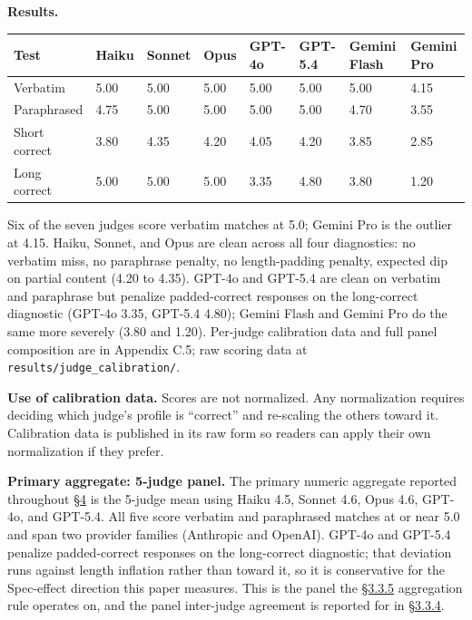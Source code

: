 \textbf{Results.}

\begin{longtable}[]{@{}llllllll@{}}
\toprule
Test & Haiku & Sonnet & Opus & GPT-4o & GPT-5.4 & Gemini Flash & Gemini
Pro \\
\midrule
\endhead
Verbatim & 5.00 & 5.00 & 5.00 & 5.00 & 5.00 & 5.00 & 4.15 \\
Paraphrased & 4.75 & 5.00 & 5.00 & 5.00 & 5.00 & 4.70 & 3.55 \\
Short correct & 3.80 & 4.35 & 4.20 & 4.05 & 4.20 & 3.85 & 2.85 \\
Long correct & 5.00 & 5.00 & 5.00 & 3.35 & 4.80 & 3.80 & 1.20 \\
\bottomrule
\end{longtable}

Six of the seven judges score verbatim matches at 5.0; Gemini Pro is the
outlier at 4.15. Haiku, Sonnet, and Opus are clean across all four
diagnostics: no verbatim miss, no paraphrase penalty, no length-padding
penalty, expected dip on partial content (4.20 to 4.35). GPT-4o and
GPT-5.4 are clean on verbatim and paraphrase but penalize padded-correct
responses on the long-correct diagnostic (GPT-4o 3.35, GPT-5.4 4.80);
Gemini Flash and Gemini Pro do the same more severely (3.80 and 1.20).
Per-judge calibration data and full panel composition are in Appendix
C.5; raw scoring data at \texttt{results/judge\_calibration/}.

\textbf{Use of calibration data.} Scores are not normalized. Any
normalization requires deciding which judge's profile is ``correct'' and
re-scaling the others toward it. Calibration data is published in its
raw form so readers can apply their own normalization if they prefer.

\textbf{Primary aggregate: 5-judge panel.} The primary numeric aggregate
reported throughout \hyperref[results]{§4} is the 5-judge mean using Haiku 4.5, Sonnet 4.6,
Opus 4.6, GPT-4o, and GPT-5.4. All five score verbatim and paraphrased
matches at or near 5.0 and span two provider families (Anthropic and
OpenAI). GPT-4o and GPT-5.4 penalize padded-correct responses on the
long-correct diagnostic; that deviation runs against length inflation
rather than toward it, so it is conservative for the Spec-effect
direction this paper measures. This is the panel the \hyperref[aggregation-and-statistical-analysis-plan]{§3.3.5} aggregation
rule operates on, and the panel inter-judge agreement is reported for in
\hyperref[inter-judge-agreement]{§3.3.4}.


